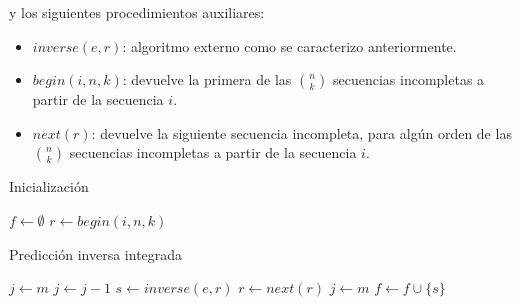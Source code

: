 y los siguientes procedimientos auxiliares:
\begin{itemize}
 \item $inverse(e,r)$: algoritmo externo como se caracterizo anteriormente.
 \item $begin(i,n,k)$: devuelve la primera de las $n \choose k$ secuencias
incompletas a partir de la secuencia $i$.
 \item $next(r)$: devuelve la siguiente secuencia incompleta, para alg\'un orden
de las $n \choose k$ secuencias incompletas a partir de la secuencia $i$.
\end{itemize}


\begin{algorithm}
 \caption{Inicializaci\'on}
\begin{algorithmic}[1]
\STATE $f \leftarrow \emptyset$ 
\STATE $r \leftarrow begin(i,n,k)$
\end{algorithmic}
\end{algorithm}

\begin{algorithm}
 \caption{Predicci\'on inversa integrada}
 \begin{algorithmic}[1]
 \STATE $j \leftarrow m$
 \REPEAT
 \STATE $j \leftarrow j-1$
 \STATE $s \leftarrow inverse(e,r)$
 \STATE $r \leftarrow next(r)$
 \STATE $j \leftarrow m$
 \ENDIF
 \STATE $f \leftarrow f \cup \{s\}$
 \end{algorithmic}
\end{algorithm}
